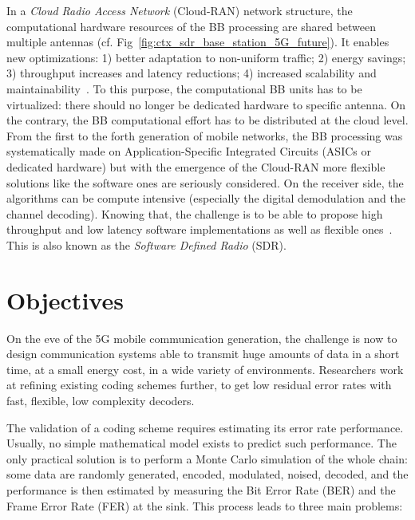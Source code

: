 In a \emph{Cloud Radio Access Network} (Cloud-RAN) network structure, the
computational hardware resources of the BB processing are shared between
multiple antennas (cf. Fig~\ref{fig:ctx_sdr_base_station_5G_future}). It
enables new optimizations: 1) better adaptation to non-uniform traffic; 2)
energy savings; 3) throughput increases and latency reductions; 4) increased
scalability and maintainability~\cite{Checko2015a}. To this purpose, the
computational BB units has to be virtualized: there should no longer be
dedicated hardware to specific antenna. On the contrary, the BB computational
effort has to be distributed at the cloud level. From the first to the forth
generation of mobile networks, the BB processing was systematically made on
Application-Specific Integrated Circuits (ASICs or dedicated hardware) but with
the emergence of the Cloud-RAN more flexible solutions like the software ones
are seriously considered. On the receiver side, the algorithms can be compute
intensive (especially the digital demodulation and the channel decoding).
Knowing that, the challenge is to be able to propose high throughput and low
latency software implementations as well as flexible ones~\cite{Nikaein2015,
Rodriguez2017}. This is also known as the \emph{Software Defined Radio} (SDR).


\section{Objectives}


On the eve of the 5G mobile communication generation, the challenge is now to
design communication systems able to transmit huge amounts of data in a short
time, at a small energy cost, in a wide variety of environments. Researchers
work at refining existing coding schemes further, to get low residual error
rates with fast, flexible, low complexity decoders.

The validation of a coding scheme requires estimating its error rate
performance. Usually, no simple mathematical model exists to predict such
performance. The only practical solution is to perform a Monte Carlo simulation
of the whole chain: some data are randomly generated, encoded, modulated,
noised, decoded, and the performance is then estimated by measuring the Bit
Error Rate (BER) and the Frame Error Rate (FER) at the sink. This process leads
to three main problems:

